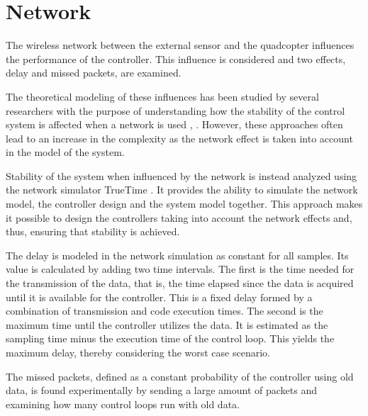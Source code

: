 \section{Network}\label{sec:network}
The wireless network between the external sensor and the quadcopter influences the performance of the controller. This influence is considered and two effects, delay and missed packets, are examined.


The theoretical modeling of these influences has been studied by several researchers with the purpose of understanding how the stability of the control system is affected when a network is used \cite{ling}, \cite{nirupam}. However, these approaches often lead to an increase in the complexity as the network effect is taken into account in the model of the system.

Stability of the system when influenced by the network is instead analyzed using the network simulator TrueTime \cite{TrueTimeNew}. It provides the ability to simulate the network model, the controller design and the system model together. This approach makes it possible to design the controllers taking into account the network effects and, thus, ensuring that stability is achieved.

The delay is modeled in the network simulation as constant for all samples. Its value is calculated by adding two time intervals. The first is the time needed for the transmission of the data, that is, the time elapsed since the data is acquired until it is available for the controller. This is a fixed delay formed by a combination of transmission and code execution times. The second is the maximum time until the controller utilizes the data. It is estimated as the sampling time minus the execution time of the control loop. This yields the maximum delay, thereby considering the worst case scenario.

The missed packets, defined as a constant probability of the controller using old data, is found experimentally by sending a large amount of packets and examining how many control loops run with old data. 
